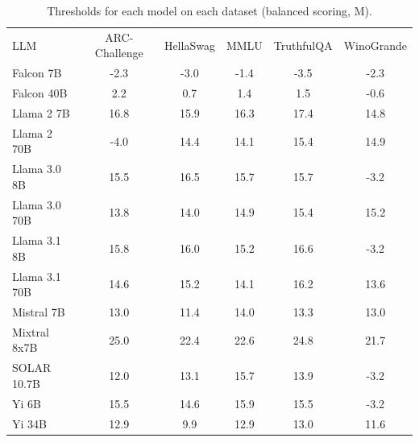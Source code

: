 \begin{table}[h]
\caption{Thresholds for each model on each dataset (balanced scoring, M). }
\label{tab:thresholds_logit_max_k20_w1}
\centering
\begin{tabular}{l S[table-format=3.1] S[table-format=3.1] S[table-format=3.1] S[table-format=3.1] S[table-format=3.1]}
\toprule
LLM & ARC-Challenge & HellaSwag & MMLU & TruthfulQA & WinoGrande \\ 
\cmidrule(lr){1-1} \cmidrule(lr){2-2} \cmidrule(lr){3-3} \cmidrule(lr){4-4} \cmidrule(lr){5-5} \cmidrule(lr){6-6}
Falcon 7B & -2.3 & -3.0 & -1.4 & -3.5 & -2.3\\
Falcon 40B & 2.2 & 0.7 & 1.4 & 1.5 & -0.6\\
Llama 2 7B & 16.8 & 15.9 & 16.3 & 17.4 & 14.8\\
Llama 2 70B & -4.0 & 14.4 & 14.1 & 15.4 & 14.9\\
Llama 3.0 8B & 15.5 & 16.5 & 15.7 & 15.7 & -3.2\\
Llama 3.0 70B & 13.8 & 14.0 & 14.9 & 15.4 & 15.2\\
Llama 3.1 8B & 15.8 & 16.0 & 15.2 & 16.6 & -3.2\\
Llama 3.1 70B & 14.6 & 15.2 & 14.1 & 16.2 & 13.6\\
Mistral 7B & 13.0 & 11.4 & 14.0 & 13.3 & 13.0\\
Mixtral 8x7B & 25.0 & 22.4 & 22.6 & 24.8 & 21.7\\
SOLAR 10.7B & 12.0 & 13.1 & 15.7 & 13.9 & -3.2\\
Yi 6B & 15.5 & 14.6 & 15.9 & 15.5 & -3.2\\
Yi 34B & 12.9 & 9.9 & 12.9 & 13.0 & 11.6\\
\bottomrule
\end{tabular}
\end{table}
